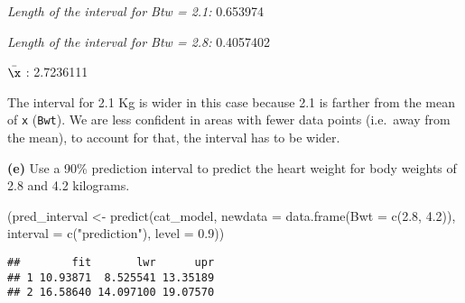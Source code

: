 \documentclass[
]{article}
\newenvironment{Shaded}{\begin{snugshade}}{\end{snugshade}}
\newcommand{\AttributeTok}[1]{\textcolor[rgb]{0.77,0.63,0.00}{#1}}
\newcommand{\DecValTok}[1]{\textcolor[rgb]{0.00,0.00,0.81}{#1}}
\newcommand{\FloatTok}[1]{\textcolor[rgb]{0.00,0.00,0.81}{#1}}
\newcommand{\FunctionTok}[1]{\textcolor[rgb]{0.00,0.00,0.00}{#1}}
\newcommand{\NormalTok}[1]{#1}
\newcommand{\OtherTok}[1]{\textcolor[rgb]{0.56,0.35,0.01}{#1}}
\newcommand{\SpecialCharTok}[1]{\textcolor[rgb]{0.00,0.00,0.00}{#1}}
\newcommand{\StringTok}[1]{\textcolor[rgb]{0.31,0.60,0.02}{#1}}
\begin{document}
\begin{Shaded}
\end{Shaded}

\emph{Length of the interval for Btw = 2.1:} 0.653974

\emph{Length of the interval for Btw = 2.8:} 0.4057402

\emph{\(\bar\x\)} : 2.7236111

The interval for 2.1 Kg is wider in this case because 2.1 is farther
from the mean of \texttt{x} (\texttt{Bwt}). We are less confident in
areas with fewer data points (i.e.~away from the mean), to account for
that, the interval has to be wider.

\textbf{(e)} Use a 90\% prediction interval to predict the heart weight
for body weights of 2.8 and 4.2 kilograms.

\begin{Shaded}
\begin{Highlighting}[]
\NormalTok{(pred\_interval }\OtherTok{\textless{}{-}} \FunctionTok{predict}\NormalTok{(cat\_model, }\AttributeTok{newdata =} \FunctionTok{data.frame}\NormalTok{(}\AttributeTok{Bwt =} \FunctionTok{c}\NormalTok{(}\FloatTok{2.8}\NormalTok{, }\FloatTok{4.2}\NormalTok{)),}
        \AttributeTok{interval =} \FunctionTok{c}\NormalTok{(}\StringTok{"prediction"}\NormalTok{), }\AttributeTok{level =} \FloatTok{0.9}\NormalTok{))}
\end{Highlighting}
\end{Shaded}

\begin{verbatim}
##        fit       lwr      upr
## 1 10.93871  8.525541 13.35189
## 2 16.58640 14.097100 19.07570
\end{verbatim}
\end{document}
